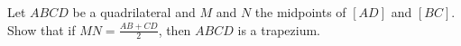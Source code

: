 Let $ABCD$ be a quadrilateral and $M$ and $N$ the midpoints of $[AD]$ and $[BC]$. Show that if $MN = \frac{AB+CD}{2}$, then $ABCD$ is a trapezium.
